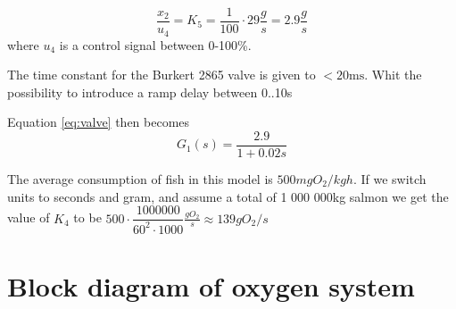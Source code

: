\documentclass{article}
\begin{document}
\begin{equation}
    \dfrac{x_2}{u_4} = K_5 =\frac{1}{100}\cdot 29\frac{g}{s} = 2.9\frac{g}{s}
\end{equation}
where $u_4$ is a control signal between 0-100\%.\newline

The time constant for the Burkert 2865 valve is given to  $<20\mathrm{ms}$. Whit the possibility to introduce a ramp delay between 0..10s \newline

Equation \ref{eq:valve} then becomes
\begin{equation}
    G_1(s) = \dfrac{2.9}{1+0.02s}
\end{equation}

The average consumption of fish in this model is $500mg O_2/kgh$. 
If we switch units to seconds and gram, and assume a total of 1 000 000kg salmon we get the value of $K_4$ to be \newline
$500 \cdot \dfrac{1000000}{60^2\cdot 1000}\frac{g O_2}{s} \approx 139 g O_2/s $



\section{Block diagram of oxygen system}
\end{document}
